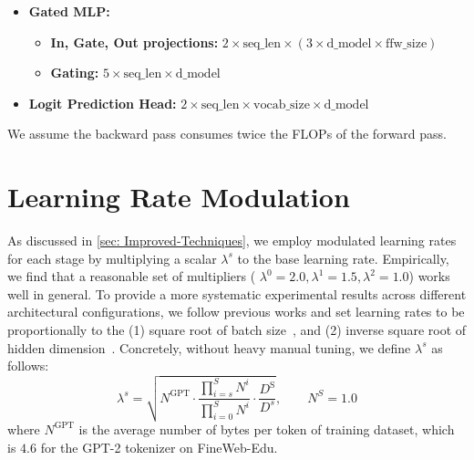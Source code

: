 \begin{itemize}
\begin{itemize}
            \item \textbf{Depthwise Convolution:} $2 \times \text{seq\_len} \times \text{d\_model} \times \text{window\_size}$
            \item \textbf{Gating:} $5 \times \text{seq\_len} \times \text{d\_model}$
            \item \textbf{Output projection:} $2 \times \text{seq\_len} \times \text{d\_model} \times \text{d\_model}$
        \end{itemize}
    \item \textbf{Gated MLP:}
        \begin{itemize}
            \item \textbf{In, Gate, Out projections:} $2 \times \text{seq\_len} \times (3 \times \text{d\_model} \times \text{ffw\_size})$
            \item \textbf{Gating:} $5 \times \text{seq\_len} \times \text{d\_model}$
        \end{itemize}
    \item \textbf{Logit Prediction Head:} $2 \times \text{seq\_len} \times \text{vocab\_size} \times \text{d\_model}$
\end{itemize}
We assume the backward pass consumes twice the FLOPs of the forward pass.

\section{Learning Rate Modulation}
\label{sec: appendix-lr_modulation}
As discussed in \cref{sec: Improved-Techniques}, we employ modulated learning rates for each stage by multiplying a scalar $\lambda^s$ to the base learning rate.
Empirically, we find that a reasonable set of multipliers (\eg{} $\lambda^0=2.0, \lambda^1=1.5, \lambda^2=1.0$) works well in general.
To provide a more systematic experimental results across different architectural configurations, we follow previous works and set learning rates to be proportionally to the (1) square root of batch size~\citep{malladi2022sdes,OLMo}, and (2) inverse square root of hidden dimension~\citep{Transformer,yang2020feature}.
Concretely, without heavy manual tuning, we define $\lambda^s$ as follows:
\begin{equation}
    \lambda^s = \sqrt{N^\text{GPT} \cdot \dfrac{\prod_{i=s}^{S} N^i}{\prod_{i=0}^{S} N^i} \cdot \dfrac{D^\text{S}}{D^s}}, \qquad N^S = 1.0
\end{equation}
where $N^\text{GPT}$ is the average number of bytes per token of training dataset, which is $4.6$ for the GPT-2 tokenizer on FineWeb-Edu.

